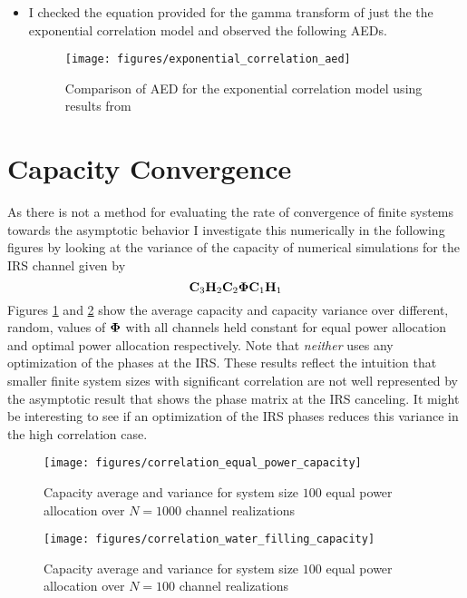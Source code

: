 \documentclass[12pt,a4paper]{report}
\begin{document}
\begin{itemize}
\item
	I checked the equation provided for the gamma transform of just the the exponential correlation model and observed the following AEDs.
		\begin{figure}[H]
	\texttt{[image: figures/exponential\_correlation\_aed]}
	  \caption{Comparison of AED for the exponential correlation model using results from \cite{skupch2005free}}
	\end{figure}

\end{itemize}
\section{Capacity Convergence}
As there is not a method for evaluating the rate of convergence of finite systems towards the asymptotic behavior I investigate this numerically in the following figures by looking at the variance of the capacity of numerical simulations for the IRS channel given by 
	\begin{equation}
	\mathbf{C}_3 \mathbf{H}_2\mathbf{C}_2 \boldsymbol{\Phi}\mathbf{C}_1 \mathbf{H}_1
	\end{equation}
Figures \ref{equal_power} and \ref{water_filling} show the average capacity and capacity variance over different, random, values of  $\boldsymbol{\Phi}$ with all channels held constant for equal power allocation and optimal power allocation respectively. Note that \emph{neither} uses any optimization of the phases at the IRS. 
These results reflect the intuition that smaller finite system sizes with significant correlation are not well represented by the asymptotic result that shows the phase matrix at the IRS canceling. It might be interesting to see if an optimization of the IRS phases reduces this variance in the high correlation case. 

		\begin{figure}[H]
	\texttt{[image: figures/correlation\_equal\_power\_capacity]}
	  \caption{Capacity average and variance for system size $100$ equal power allocation over $N=1000$ channel realizations}
	  \label{equal_power}
	\end{figure}
	
		\begin{figure}[H]
	\texttt{[image: figures/correlation\_water\_filling\_capacity]}
	  \caption{Capacity average and variance for system size $100$ equal power allocation over $N=100$ channel realizations}
	  	  \label{water_filling}
	\end{figure}
\end{document}
